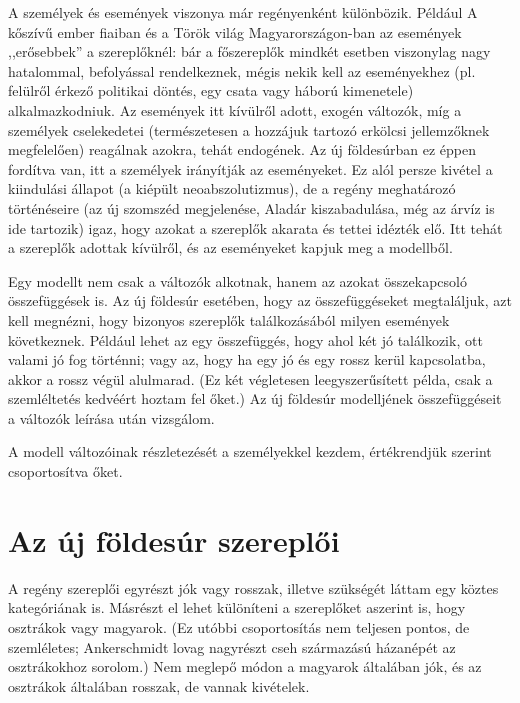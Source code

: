 \documentclass{thesis-ekf}
\begin{document}
    A személyek és események viszonya már regényenként különbözik.
    Például A kőszívű ember fiaiban és a Török világ Magyarországon-ban az események ,,erősebbek'' a szereplőknél:
        bár a főszereplők mindkét esetben viszonylag nagy hatalommal, befolyással rendelkeznek, mégis nekik kell az
        eseményekhez (pl. felülről érkező politikai döntés, egy csata vagy háború kimenetele) alkalmazkodniuk.
    Az események itt kívülről adott, exogén változók, míg a személyek cselekedetei
        (természetesen a hozzájuk tartozó erkölcsi jellemzőknek megfelelően) reagálnak azokra, tehát endogének.
    Az új földesúrban ez éppen fordítva van, itt a személyek irányítják az eseményeket.
    Ez alól persze kivétel a kiindulási állapot (a kiépült neoabszolutizmus), de a regény meghatározó történéseire
        (az új szomszéd megjelenése, Aladár kiszabadulása, még az árvíz is ide tartozik) igaz,
        hogy azokat a szereplők akarata és tettei idézték elő.
    Itt tehát a szereplők adottak kívülről, és az eseményeket kapjuk meg a modellből.

    Egy modellt nem csak a változók alkotnak, hanem az azokat összekapcsoló összefüggések is.
    Az új földesúr esetében, hogy az összefüggéseket megtaláljuk, azt kell megnézni, hogy bizonyos szereplők
        találkozásából milyen események következnek.
    Például lehet az egy összefüggés, hogy ahol két jó találkozik, ott valami jó fog történni;
        vagy az, hogy ha egy jó és egy rossz kerül kapcsolatba, akkor a rossz végül alulmarad.
    (Ez két végletesen leegyszerűsített példa, csak a szemléltetés kedvéért hoztam fel őket.)
    Az új földesúr modelljének összefüggéseit a változók leírása után vizsgálom.

    A modell változóinak részletezését a személyekkel kezdem, értékrendjük szerint csoportosítva őket.


    \section{Az új földesúr szereplői}\label{sec:az-uj-foldesur-szereploi}

    A regény szereplői egyrészt jók vagy rosszak, illetve szükségét láttam egy köztes kategóriának is.
    Másrészt el lehet különíteni a szereplőket aszerint is, hogy osztrákok vagy magyarok.
    (Ez utóbbi csoportosítás nem teljesen pontos, de szemléletes;
        Ankerschmidt lovag nagyrészt cseh származású házanépét az osztrákokhoz sorolom.)
    Nem meglepő módon a magyarok általában jók, és az osztrákok általában rosszak, de vannak kivételek.
\end{document}

